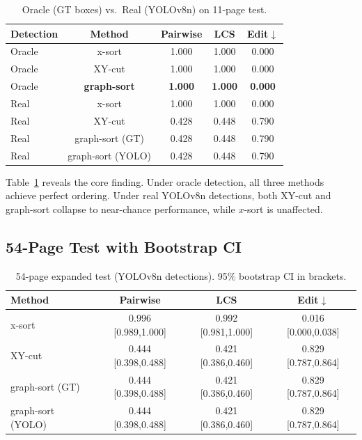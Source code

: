 \documentclass[5p,times,twocolumn]{elsarticle}
\begin{document}
\begin{table}[!ht]
\centering
\caption{Oracle (GT boxes) vs.\ Real (YOLOv8n) on 11-page test.}
\label{tab:oracle}
\scriptsize
\begin{tabular}{lcccc}
\toprule
Detection & Method & Pairwise & LCS & Edit$\downarrow$ \\
\midrule
Oracle & x-sort & 1.000 & 1.000 & 0.000 \\
Oracle & XY-cut & 1.000 & 1.000 & 0.000 \\
Oracle & \textbf{graph-sort} & \textbf{1.000} & \textbf{1.000} & \textbf{0.000} \\
\midrule
Real  & x-sort & 1.000 & 1.000 & 0.000 \\
Real  & XY-cut & 0.428 & 0.448 & 0.790 \\
Real  & graph-sort (GT) & 0.428 & 0.448 & 0.790 \\
Real  & graph-sort (YOLO) & 0.428 & 0.448 & 0.790 \\
\bottomrule
\end{tabular}
\end{table}

Table~\ref{tab:oracle} reveals the core finding. Under oracle detection, all three methods achieve perfect ordering. Under real YOLOv8n detections, both XY-cut and graph-sort collapse to near-chance performance, while $x$-sort is unaffected.

\subsection{54-Page Test with Bootstrap CI}

\begin{table}[!ht]
\centering
\caption{54-page expanded test (YOLOv8n detections). 95\% bootstrap CI in brackets.}
\label{tab:main}
\scriptsize
\begin{tabular}{lccc}
\toprule
Method & Pairwise & LCS & Edit$\downarrow$ \\
\midrule
x-sort           & 0.996 [0.989,1.000] & 0.992 [0.981,1.000] & 0.016 [0.000,0.038] \\
XY-cut           & 0.444 [0.398,0.488] & 0.421 [0.386,0.460] & 0.829 [0.787,0.864] \\
graph-sort (GT)  & 0.444 [0.398,0.488] & 0.421 [0.386,0.460] & 0.829 [0.787,0.864] \\
graph-sort (YOLO) & 0.444 [0.398,0.488] & 0.421 [0.386,0.460] & 0.829 [0.787,0.864] \\
\bottomrule
\end{tabular}
\end{table}
\end{document}
